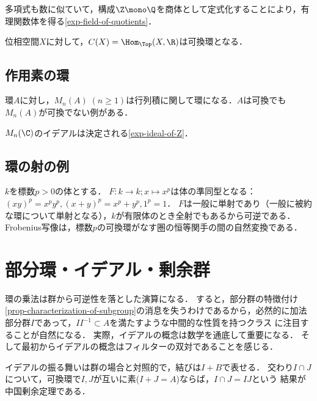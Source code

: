 \documentclass[uplatex,dvipdfmx]{jsreport}
\begin{document}
\begin{example}[有理関数体]
    多項式も数に似ていて，構成$\Z\mono\Q$を商体として定式化することにより，有理関数体を得る\ref{exp-field-of-quotients}．
\end{example}

\begin{example}
    位相空間$X$に対して，$C(X)=\Hom_\Top(X,\R)$は可換環となる．
\end{example}

\subsection{作用素の環}

\begin{example}
    環$A$に対し，$M_n(A)\;(n\ge 1)$は行列積に関して環になる．$A$は可換でも$M_n(A)$が可換でない例がある．
\end{example}

\begin{example}
    $M_n(\C)$のイデアルは決定される\ref{exp-ideal-of-Z}．
\end{example}

\subsection{環の射の例}

\begin{example}
    $k$を標数$p>0$の体とする．
    $F:k\to k;x\mapsto x^p$は体の準同型となる：$(xy)^p=x^py^p,(x+y)^p=x^p+y^p,1^p=1$．
    $F$は一般に単射であり（一般に被約な環について単射となる），$k$が有限体のとき全射でもあるから可逆である．
    Frobenius写像は，標数$p$の可換環がなす圏の恒等関手の間の自然変換である．
\end{example}

\section{部分環・イデアル・剰余群}

\begin{tcolorbox}[colframe=ForestGreen, colback=ForestGreen!10!white,breakable,colbacktitle=ForestGreen!40!white,coltitle=black,fonttitle=\bfseries\sffamily,
title=]
    環の乗法は群から可逆性を落とした演算になる．
    すると，部分群の特徴付け\ref{prop-characterization-of-subgroup}の消息を失うわけであるから，必然的に加法部分群$I$であって，$II^{-1}\subset A$を満たすような中間的な性質を持つクラス
    に注目することが自然になる．
    実際，イデアルの概念は数学を通底して重要になる．
    そして最初からイデアルの概念はフィルターの双対であることを感じる．
    
    イデアルの振る舞いは群の場合と対照的で，結びは$I+B$で表せる．
    交わり$I\cap J$について，可換環で$I,J$が互いに素($I+J=A$)ならば，$I\cap J=IJ$という
    結果が中国剰余定理である．
\end{tcolorbox}
\end{document}
